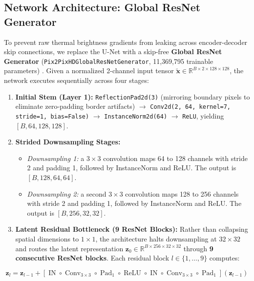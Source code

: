 \documentclass[10pt,a4paper,twoside]{article}
\begin{document}
\subsection{Network Architecture: Global ResNet Generator}
To prevent raw thermal brightness gradients from leaking across encoder-decoder skip connections, we replace the U-Net with a skip-free \textbf{Global ResNet Generator} (\texttt{Pix2PixHDGlobalResNetGenerator}, 11,369,795 trainable parameters) \cite{ref8, ref12, ref19}. Given a normalized 2-channel input tensor $\tilde{\mathbf{x}} \in \mathbb{R}^{B \times 2 \times 128 \times 128}$, the network executes sequentially across four stages:

\begin{enumerate}
    \item \textbf{Initial Stem (Layer 1):} \texttt{ReflectionPad2d(3)} (mirroring boundary pixels to eliminate zero-padding border artifacts) $\to$ \texttt{Conv2d(2, 64, kernel=7, stride=1, bias=False)} $\to$ \texttt{InstanceNorm2d(64)} \cite{ref22} $\to$ \texttt{ReLU}, yielding $[B, 64, 128, 128]$.
    \item \textbf{Strided Downsampling Stages:}
          \begin{itemize}
              \item \textit{Downsampling 1:} a $3 \times 3$ convolution maps 64 to 128 channels with stride 2 and padding 1, followed by InstanceNorm and ReLU. The output is $[B,128,64,64]$.
              \item \textit{Downsampling 2:} a second $3 \times 3$ convolution maps 128 to 256 channels with stride 2 and padding 1, followed by InstanceNorm and ReLU. The output is $[B,256,32,32]$.
          \end{itemize}
    \item \textbf{Latent Residual Bottleneck (9 ResNet Blocks):} Rather than collapsing spatial dimensions to $1 \times 1$, the architecture halts downsampling at $32 \times 32$ and routes the latent representation $\mathbf{z}_0 \in \mathbb{R}^{B \times 256 \times 32 \times 32}$ through \textbf{9 consecutive ResNet blocks}. Each residual block $l \in \{1, \dots, 9\}$ computes:
\end{enumerate}

\begin{equation}
    \mathbf{z}_l = \mathbf{z}_{l-1} + \left[ \operatorname{IN} \circ \operatorname{Conv}_{3\times 3} \circ \operatorname{Pad}_1 \circ \operatorname{ReLU} \circ \operatorname{IN} \circ \operatorname{Conv}_{3\times 3} \circ \operatorname{Pad}_1 \right](\mathbf{z}_{l-1})
    \label{eq:resnet}
\end{equation}
\end{document}
